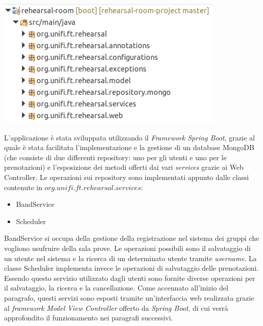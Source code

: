 \begin{minipage}{\linewidth}
	\includegraphics[width=\textwidth]{img/packages.png}
\end{minipage}
\newline

L'applicazione è stata sviluppata utilizzando il \textsl{Framework Spring Boot}, grazie al quale è stata facilitata l'implementazione e la gestione di un database MongoDB (che consiste di due differenti repository: uno per gli utenti e uno per le prenotazioni) e l'esposizione dei metodi offerti dai vari \textsl{services} grazie ai Web Controller.\newline\newline
Le operazioni sui repository sono implementati appunto dalle classi contenute in $org.unifi.ft.rehearsal.services$:
\begin{itemize}
	\item BandService
	\item Scheduler
\end{itemize}

BandService si occupa della gestione della registrazione nel sistema dei gruppi che vogliono usufruire della sala prove. Le operazioni possibili sono il salvataggio di un utente nel sistema e la ricerca di un determinato utente tramite \textsl{username}.\newline
La classe Scheduler implementa invece le operazioni di salvataggio delle prenotazioni. Essendo questo servizio utilizzato dagli utenti sono fornite diverse operazioni per il salvataggio, la ricerca e la cancellazione.\newline\newline
Come accennato all'inizio del paragrafo, questi servizi sono esposti tramite un'interfaccia web realizzata grazie al \textsl{framework Model View Controller} offerto da \textsl{Spring Boot}, di cui verrà approfondito il funzionamento nei paragrafi successivi.